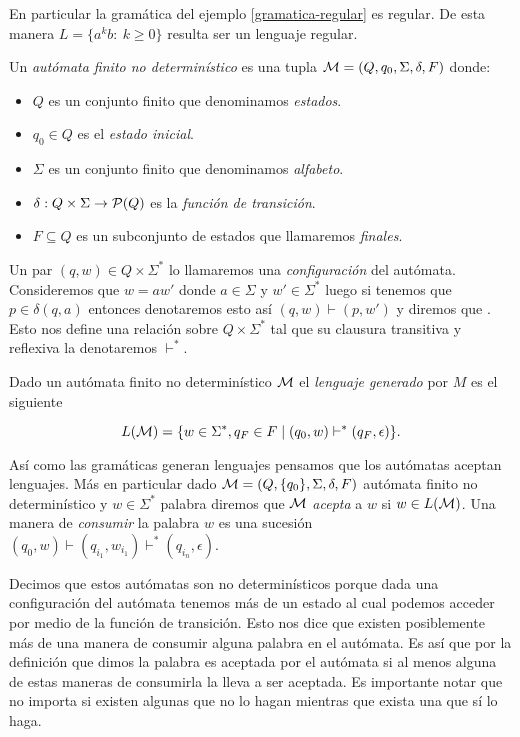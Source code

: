 \documentclass[tesis.tex]{subfiles}
\begin{document}
En particular la gramática del ejemplo \ref{gramatica-regular} es regular. 
De esta manera $L= \{ a^k b : \ k \ge 0  \}$ resulta ser un lenguaje regular.


\begin{deff}
	Un \emph{autómata finito no determinístico} es una tupla ${\cal M} = (Q,q_0,\Sigma,\delta,F)$ donde:
	\begin{itemize}
		\item $Q$ es un conjunto finito que denominamos \emph{estados}.
		\item $q_0 \in Q$ es el \emph{estado inicial}.
		\item $\Sigma$ es un conjunto finito que denominamos \emph{alfabeto}.
		\item $\delta:Q \times \Sigma \to {\cal P}(Q)$ es la \emph{función de transición}.
		\item $F \subseteq Q$ es un subconjunto de estados que llamaremos \emph{finales}.
	\end{itemize}
\end{deff}

Un par $(q,w) \in Q \times \Sigma^*$ lo llamaremos una \emph{configuración} del autómata.
Consideremos que $w = aw'$ donde $a \in \Sigma$ y $w' \in \Sigma^*$ luego si tenemos que $p \in \delta(q,a) $ entonces denotaremos esto así $(q,w) \vdash (p,w')$ y diremos que .
Esto nos define una relación sobre $Q \times \Sigma^*$ tal que su clausura transitiva y reflexiva 
la denotaremos $\vdash^*$.


\begin{deff}
	Dado un autómata finito no determinístico $\cal M$ el \emph{lenguaje generado} por $M$ es el siguiente
	
	\[
	L({\cal M} ) = \{  w \in \Sigma^*, q_F \in F \mid (q_0,w) \vdash^* (q_F,\epsilon)     \}.
	\]
\end{deff}
\medskip

Así como las gramáticas generan lenguajes pensamos que los autómatas aceptan lenguajes.
Más en particular dado ${\cal M} = (Q,\{q_0\},\Sigma,\delta,F)$ autómata finito no determinístico y $w \in \Sigma^*$ palabra diremos que $\cal M$ \emph{acepta} a $w$ si $w \in L(\cal M)$.
Una manera de \emph{consumir} la palabra $w$ es una sucesión $(q_0,w) \vdash (q_{i_{1}}, w_{i_{1}}) \vdash^{*} (q_{i_{n}}, \epsilon)$.

\medskip

\begin{obs}
	Decimos que estos autómatas son no determinísticos porque dada una configuración del autómata tenemos más de un estado al cual podemos acceder por medio de la función de transición.
	Esto nos dice que existen posiblemente más de una manera de consumir alguna palabra en el autómata. 
	Es así que por la definición que dimos la palabra es aceptada por el autómata si al menos alguna de estas maneras de consumirla la lleva a ser aceptada.
	Es importante notar que no importa si existen algunas que no lo hagan mientras que exista una que sí lo haga. 
\end{obs}
\end{document}

